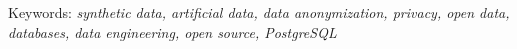 Keywords: \textit{synthetic data, artificial data, data anonymization, privacy, open data, databases, data engineering, open source, PostgreSQL}